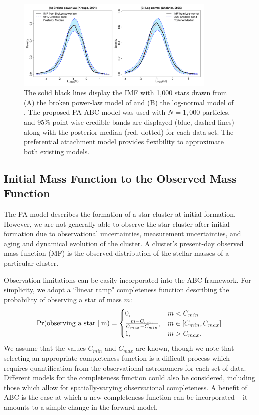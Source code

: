 \documentclass[12pt]{article}
\newcommand{\Proba}{\rm{Pr}}
\begin{document}
\begin{figure} \centering
	\includegraphics[width=0.85\textwidth]{figures/KroupaChabrier.pdf}
	\vspace{-0.1in}
	\caption{The solid black lines display the IMF with 1,000 stars drawn from (A) the broken power-law model of \cite{kroupa2001} and (B) the log-normal model of \cite{chabrier2005}.  The proposed PA ABC model was used with $N = 1,000$ particles, and 95\% point-wise credible bands are displayed (blue, dashed lines) along with the posterior median (red, dotted) for each data set.  The preferential attachment model provides flexibility to approximate both existing models.
	}
	\label{fig:otherModels}
\end{figure}




\subsection{Initial Mass Function to the Observed Mass Function} \label{sec:obs_challenges}
The PA model describes the formation of a star cluster at initial formation.  However, we are not generally able to observe the star cluster after initial formation due to observational uncertainties, measurement uncertainties, and aging and dynamical evolution of the cluster.  A cluster's present-day observed mass function (MF) is the observed distribution of the stellar masses of a particular cluster.

Observation limitations can be easily incorporated into the ABC framework.  For simplicity, we adopt a ``linear ramp" completeness function describing the probability of observing a star of mass $m$:
\begin{align}
	\Proba(\text{observing a star} \mid m) = \begin{cases} 0 \text{,} & m < C_{min}\\
								\frac{m - C_{min}}{C_{max} - C_{min}}\text{,} & m \in [C_{min}, C_{max}] \\
								1 \text{,} & m > C_{max} \text{.}
								\end{cases} \label{eq:ramp}
\end{align}
We assume that the values $C_{min}$ and $C_{max}$ are known, though we note that selecting an appropriate completeness function is a difficult process which requires quantification from the observational astronomers for each set of data.
Different models for the completeness function could also be considered, including those which allow for spatially-varying observational completeness.  A benefit of ABC is the ease at which a new completeness function can be incorporated -- it amounts to a simple change in the forward model.  
\end{document}
